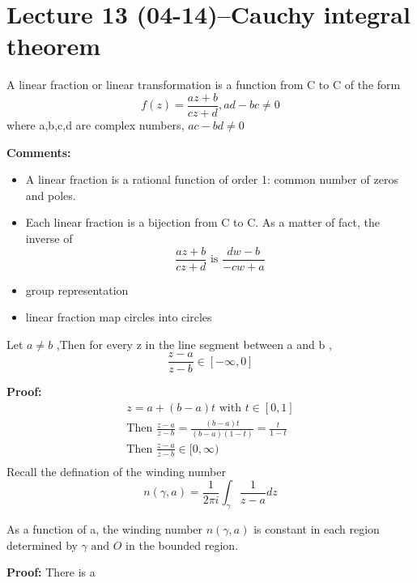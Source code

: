 \section{Lecture 13 (04-14)--{Cauchy integral theorem}}
\begin{definition}{}
A linear fraction or linear transformation is a function from C to C of the form$$
    f(z)=\frac{az+b}{cz+d},ad-bc\neq0
$$
where a,b,c,d are complex numbers, $ac-bd\neq0$
\end{definition}
\textbf{Comments:}
\begin{itemize}
\item A linear fraction is a rational function of order 1: common number of zeros and poles.
\item Each linear fraction is a bijection from C to C. As a matter of fact, the inverse of $$
    \frac{az+b}{cz+d} \text{ is } \frac{dw-b}{-cw+a}
$$ 
\item group representation
\item linear fraction map circles into circles
\end{itemize}
\begin{lemma}[]{}
Let $ a\neq b $ ,Then for every z in the line segment between a and b ,$$
    \frac{z-a}{z-b}\in [-\infty,0]
$$ 
\end{lemma}
\textbf{Proof:}
\begin{align*}{}{}
z=a+(b-a)t \text{ with }t\in[0,1]\\
\text{Then } \frac{z-a}{z-b}=\frac{(b-a)t}{(b-a)(1-t)}=\frac{t}{1-t}\\
\text{Then } \frac{z-a}{z-b}\in [0,\infty)\\
\end{align*}
Recall the defination of the winding number
$$
    n(\gamma,a)=\frac{1}{2\pi i}\int_{\gamma}\frac{1}{z-a}dz
$$ 
\begin{lemma}[]{}
As a function of a, the winding number $  n(\gamma,a)$ is constant in each region determined by $ \gamma \text{ and } O $ in the bounded region.  
\end{lemma}
\textbf{Proof:}
There is a

